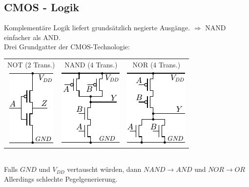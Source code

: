 \documentclass[6pt,a4paper]{scrartcl}
\newcommand{\ra}[0]{\ensuremath{\rightarrow}} 									%
\begin{document}
\begin{multicols}{3}
\section{CMOS - Logik}
Komplementäre Logik liefert grundsätzlich negierte Ausgänge. $\Rightarrow$ NAND einfacher als AND.\\
Drei Grundgatter der CMOS-Technologie:\\
	\begin{tabular}{ccc}
		NOT (2 Trans.) & NAND (4 Trans.) & NOR (4 Trans.)\\
		\includegraphics{./img/ds/mosfet_not.pdf} \quad & \includegraphics{./img/ds/mosfet_nand.pdf} \quad & \includegraphics{./img/ds/mosfet_nor.pdf} \\
	\end{tabular}\\
	Falls $GND$ und $V_{DD}$ vertauscht würden, dann $NAND \ra AND$ und $NOR \ra OR$\\
	Allerdings schlechte Pegelgenerierung.
	

\end{multicols}
\end{document}
